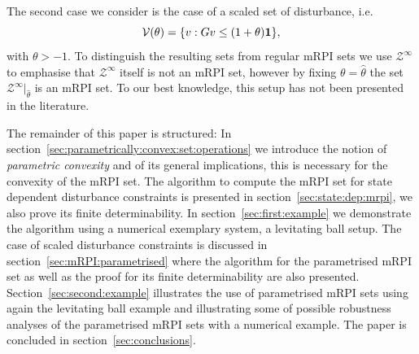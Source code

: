 \documentclass[letterpaper, 10pt, conference]{ieeeconf} %
\begin{document}
The second case we consider is the case of a scaled set of disturbance, i.e.
\begin{equation}
  \mathcal V(\theta) = \{v:Gv\leq(1+\theta){\bf{1}}\},
\end{equation}
with $\theta>-1$. To distinguish the resulting sets from regular mRPI sets we use $\mathcal Z^\infty$
to emphasise that $\mathcal Z^\infty$ itself is not an mRPI set, however by fixing $\theta=\hat\theta$ the
set $\mathcal Z^\infty\vert_{\hat\theta}$ is an mRPI set. To our best knowledge, this setup has not been 
presented in the literature.

The remainder of this paper is structured: In section~\ref{sec:parametrically:convex:set:operations} we
introduce the notion of \emph{parametric convexity} and of its general implications, this is necessary 
for the convexity of the mRPI set. The algorithm to compute the mRPI set for state dependent disturbance
constraints is presented in section~\ref{sec:state:dep:mrpi}, we also prove its finite determinability.
In section~\ref{sec:first:example} we demonstrate the algorithm using a numerical exemplary system, a
levitating ball setup. The case of scaled disturbance constraints is discussed in section~\ref{sec:mRPI:parametrised}
where the algorithm for the parametrised mRPI set as well as the proof for its finite determinability
are also presented. Section~\ref{sec:second:example} illustrates the use of parametrised mRPI sets using
again the levitating ball example and illustrating some of possible robustness analyses of the parametrised
mRPI sets with a numerical example. The paper is concluded in section~\ref{sec:conclusions}.
%
%
%
\end{document}
